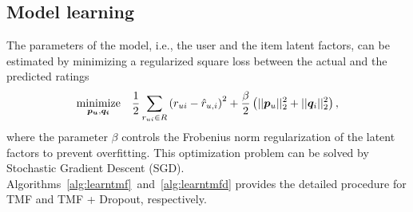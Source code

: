 \subsection{Model learning}
The parameters of the model, i.e., the user and the item latent factors, can be estimated by minimizing a regularized
square loss between the actual and the predicted ratings 
\begin{equation} \label{mf_drop_obj}
  \begin{aligned}
    \minimize_{\bm{p_u}, \bm{q_i}} & &\frac{1}{2}\sum_{r_{ui} \in R}
    \left(r_{ui} - \hat{r}_{u,i} \right)^2+ \frac{\beta}{2}
    \left(||\bm{p}_u||_2^2 + ||\bm{q}_i||_2^2 \right),
  \end{aligned}
\end{equation}
\noindent where the parameter $\beta$ controls the Frobenius norm regularization
of the latent factors to prevent overfitting. This optimization problem can be
solved by Stochastic Gradient Descent (SGD).
Algorithms~\ref{alg:learntmf}~and~\ref{alg:learntmfd} provides the detailed procedure
for TMF and TMF + Dropout, respectively. 

